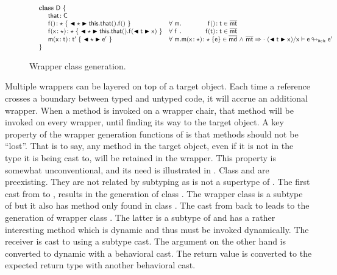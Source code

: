 \documentclass[a4paper,USenglish]{tex/lipics-v2016}
\begin{document}
\begin{figure}[!ht]
\[\begin{array}{@{}ll@{}l@{}r@{~}c@{~}r}
\SP \class~\D~\{\\
\SPP \Fdef \that \C\\ 
\SPP   \Mdefz\f\any{~\BehCast\any{\Get{{\Get\this\that}}\f}~}
&  \All \m  \Mtype\f{}\t \in \bmt\\
\SPP   \Mdef\f\x\any\any{~\BehCast\any{\Set{\Get\this\that}\f{\BehCast\t\x}}~}
&  \All \f  \Mtype\f\t\t \in \bmt\\
\SPP   \Mdef\m\x\t\tp {~\BehCast\any{{\ep}}~}
&  \All \m \Mdef\m\x\any\any\e\in\b\md  &\wedge& \rtranst{\bmt}\cdot{(\BehCast\t\x)}\x{\e}{\ep}\\
\SP \}\\
\end{array}\]
\hrulefill
  \caption{Wrapper class generation.}\label{wrap}
\end{figure}

Multiple wrappers can be layered on top of a target object. Each time a
reference crosses a boundary between typed and untyped code, it will accrue
an additional wrapper. When a method is invoked on a wrapper chair, that
method will be invoked on every wrapper, until finding its way to the target
object. A key property of the wrapper generation functions of 
is that methods should not be ``lost''. That is to say, any method in the
target object, even if it is not in the type it is being cast to, will be
retained in the wrapper.  This property is somewhat unconventional, and its
need is illustrated in . Class \C and \D are preexisting.  They
are not related by subtyping as \any is not a supertype of \E. The first
cast from \C to \D, results in the generation of class . The
wrapper class is a subtype of \D but it also has method \mp only found in
class \C.  The cast from  back to \C leads to the generation of
wrapper class . The latter is a subtype of \C and has a rather
interesting method \m which is dynamic and thus must be invoked dynamically.
The receiver is cast to \any using a subtype cast. The argument on the other
hand is converted to dynamic with a behavioral cast. The return value is
converted to the expected return type with another behavioral cast.
\end{document}
